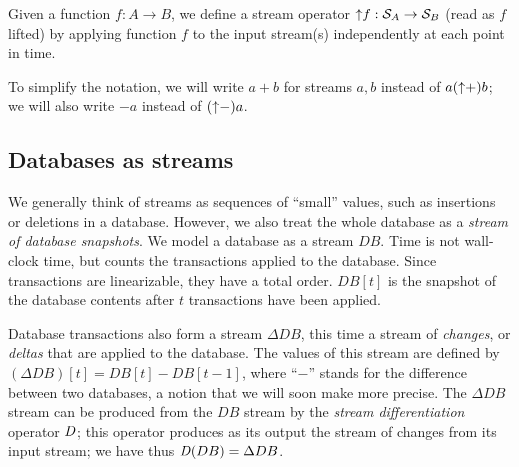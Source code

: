 Given a function $f: A \to B$, we define a stream operator ${\uparrow}f
:\mathcal{S}_{A} \to \mathcal{S}_{B}$ (read as $f$ lifted) by applying function
$f$ to the input stream(s) independently at each point in time.
\begin{center}
\end{center}

To simplify the notation, we will write $a + b$ for streams $a, b$
instead of $a ({\uparrow}+) b$; we will also write $-a$ instead of
$({\uparrow}-)a$.

\subsection{Databases as streams}

We generally think of streams as sequences of ``small'' values, such
as insertions or deletions in a database.  However, we also treat the
whole database as a \emph{stream of database snapshots}.  We model a
database as a stream $DB$.  Time is not wall-clock time, but counts
the transactions applied to the database.  Since transactions are
linearizable, they have a total order.  $DB[t]$ is the snapshot of the
database contents after $t$ transactions have been applied.

Database transactions also form a stream $\Delta DB$, this time a
stream of \emph{changes}, or \emph{deltas} that are applied to the
database.  The values of this stream are defined by $(\Delta DB)[t] =
DB[t] - DB[t-1]$, where ``$-$'' stands for the difference between two
databases, a notion that we will soon make more precise.  The $\Delta
DB$ stream can be produced from the $DB$ stream by the \emph{stream
differentiation} operator $\mathit{D}$; this operator produces as its output
the stream of changes from its input stream; we have thus $\mathit{D}(DB) =
\Delta DB$.

